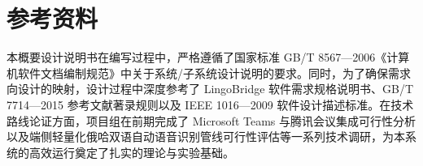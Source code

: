 \section{参考资料}
本概要设计说明书在编写过程中，严格遵循了国家标准 GB/T 8567—2006《计算机软件文档编制规范》中关于系统/子系统设计说明的要求\cite{gb8567}。同时，为了确保需求向设计的映射，设计过程中深度参考了 LingoBridge 软件需求规格说明书\cite{gb9385}、GB/T 7714—2015 参考文献著录规则\cite{gb7714}以及 IEEE 1016—2009 软件设计描述标准\cite{ieee1016}。在技术路线论证方面，项目组在前期完成了 Microsoft Teams 与腾讯会议集成可行性分析以及端侧轻量化俄哈双语自动语音识别管线可行性评估等一系列技术调研，为本系统的高效运行奠定了扎实的理论与实验基础。
